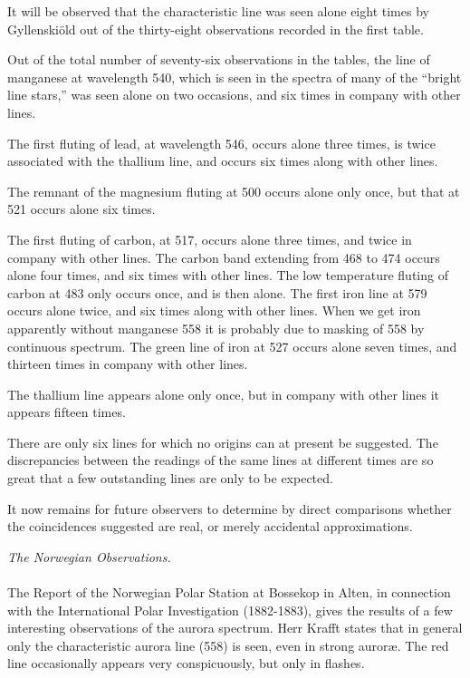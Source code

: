 \documentclass[a4paper, 12pt, oneside, polutonikogreek, english]{article}
\begin{document}
It will be observed that the characteristic line was seen alone eight times by Gyllenskiöld out of the thirty-eight observations recorded in the first table.

Out of the total number of seventy-six observations in the tables, the line of manganese at wavelength 540, which is seen in the spectra of many of the ``bright line stars,'' was seen alone on two occasions, and six times in company with other lines.

The first fluting of lead, at wavelength 546, occurs alone three times, is twice associated with the thallium line, and occurs six times along with other lines.

The remnant of the magnesium fluting at 500 occurs alone only once, but that at 521 occurs alone six times.

The first fluting of carbon, at 517, occurs alone three times, and twice in company with other lines. The carbon band extending from 468 to 474 occurs alone four times, and six times with other lines. The low temperature fluting of carbon at 483 only occurs once, and is then alone. The first iron line at 579 occurs alone twice, and six times along with other lines. When we get iron apparently without manganese 558 it is probably due to masking of 558 by continuous spectrum. The green line of iron at 527 occurs alone seven times, and thirteen times in company with other lines.

The thallium line appears alone only once, but in company with other lines it appears fifteen times.

There are only six lines for which no origins can at present be suggested. The discrepancies between the readings of the same lines at different times are so great that a few outstanding lines are only to be expected.

It now remains for future observers to determine by direct comparisons whether the coincidences suggested are real, or merely accidental approximations.
\begin{center}
\emph{The Norwegian Observations.}
\end{center}
\paragraph{}
The Report of the Norwegian Polar Station at Bossekop in Alten, in connection with the International Polar Investigation (1882-1883), gives the results of a few interesting observations of the aurora spectrum. Herr Krafft states that in general only the characteristic aurora line (558) is seen, even in strong auroræ. The red line occasionally appears very conspicuously, but only in flashes.
\end{document}

